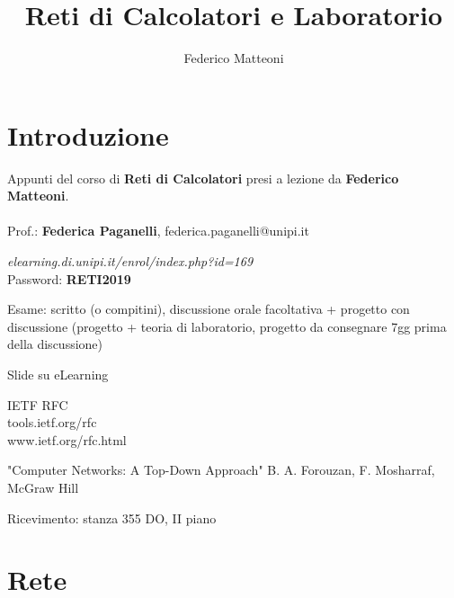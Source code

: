 \documentclass[10pt]{article}
\begin{document}
\title{Reti di Calcolatori e Laboratorio}
\author{Federico Matteoni}
\date{ }
\renewcommand*\contentsname{Indice}

\maketitle
\begin{multicols}{2}
\tableofcontents
\end{multicols}
\pagebreak
\section{Introduzione}
Appunti del corso di \textbf{Reti di Calcolatori} presi a lezione da \textbf{Federico Matteoni}.\\\\
Prof.: \textbf{Federica Paganelli}, federica.paganelli@unipi.it\\
\begin{list}{-}{Riferimenti web:}
\item \emph{elearning.di.unipi.it/enrol/index.php?id=169}\\Password: \textbf{RETI2019}
\end{list}
Esame: scritto (o compitini), discussione orale facoltativa + progetto con discussione (progetto + teoria di laboratorio, progetto da consegnare 7gg prima della discussione)\\
\begin{list}{-}{Libri e materiale didattico:}
\item Slide su eLearning
\item IETF RFC\\tools.ietf.org/rfc\\www.ietf.org/rfc.html
\item "Computer Networks: A Top-Down Approach" B. A. Forouzan, F. Mosharraf, McGraw Hill
\end{list}
Ricevimento: stanza 355 DO, II piano

\section{Rete}
\end{document}
